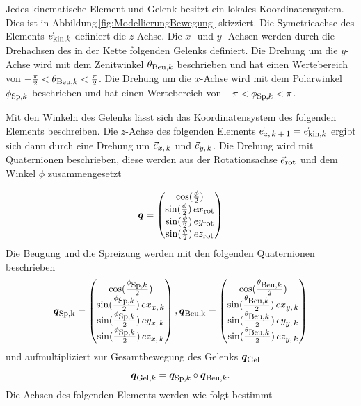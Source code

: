 Jedes kinematische Element und Gelenk besitzt ein lokales Koordinatensystem. Dies ist in Abbildung\,\ref{fig:ModellierungBewegung} skizziert. Die Symetrieachse des Elements $\vec{e}_{\textrm{\footnotesize{kin,$k$}}}$ definiert die $z$-Achse. Die $x$- und $y$- Achsen werden durch die Drehachsen des in der Kette folgenden Gelenks definiert. Die Drehung um die $y$-Achse wird mit dem Zenitwinkel $\theta_{\textrm{\footnotesize{Beu,$k$}}}$ beschrieben und hat einen Wertebereich von $-\frac{\pi}{2} < \theta_{\textrm{\footnotesize{Beu,$k$}}} < \frac{\pi}{2}$. Die Drehung um die $x$-Achse wird mit dem Polarwinkel $\phi_{\textrm{\footnotesize{Sp,$k$}}}$ beschrieben und hat einen Wertebereich von $-\pi < \phi_{\textrm{\footnotesize{Sp,$k$}}} < \pi$. 

Mit den Winkeln des Gelenks lässt sich das Koordinatensystem des folgenden Elements beschreiben. Die $z$-Achse des folgenden Elements $\vec{e}_{\textrm{\footnotesize{$z,k+1$}}} = \vec{e}_{\textrm{\footnotesize{kin,$k$}}}$ ergibt sich dann durch eine Drehung um $\vec{e}_{\textrm{\footnotesize{$x,k$}}}$ und $\vec{e}_{\textrm{\footnotesize{$y,k$}}}$. Die Drehung wird mit Quaternionen beschrieben, diese werden aus der Rotationsachse $\vec{e}_{\textrm{\footnotesize{rot}}}$ und dem Winkel $\phi$ zusammengesetzt 

\begin{equation}
    \mbox{\boldmath ${q}$} = \begin{pmatrix}
        \cos(\frac{\phi}{2}) \\
        \sin(\frac{\phi}{2})\,ex_{\textrm{\footnotesize{rot}}} \\
        \sin(\frac{\phi}{2})\,ey_{\textrm{\footnotesize{rot}}} \\
        \sin(\frac{\phi}{2})\,ez_{\textrm{\footnotesize{rot}}} 
    \end{pmatrix}
\end{equation}
Die Beugung und die Spreizung werden mit den folgenden Quaternionen beschrieben
\begin{equation}
    \mbox{\boldmath ${q}$}_{\textrm{\footnotesize{Sp,k}}} = \begin{pmatrix}
        \cos(\frac{\phi_{\textrm{\footnotesize{Sp,$k$}}}}{2}) \\
        \sin(\frac{\phi_{\textrm{\footnotesize{Sp,$k$}}}}{2})\,ex_{\textrm{\footnotesize{$x,k$}}} \\
        \sin(\frac{\phi_{\textrm{\footnotesize{Sp,$k$}}}}{2})\,ey_{\textrm{\footnotesize{$x,k$}}} \\
        \sin(\frac{\phi_{\textrm{\footnotesize{Sp,$k$}}}}{2})\,ez_{\textrm{\footnotesize{$x,k$}}} 
    \end{pmatrix},
    \mbox{\boldmath ${q}$}_{\textrm{\footnotesize{Beu,k}}} = \begin{pmatrix}
        \cos(\frac{\theta_{\textrm{\footnotesize{Beu,$k$}}}}{2}) \\
        \sin(\frac{\theta_{\textrm{\footnotesize{Beu,$k$}}}}{2})\,ex_{\textrm{\footnotesize{$y,k$}}} \\
        \sin(\frac{\theta_{\textrm{\footnotesize{Beu,$k$}}}}{2})\,ey_{\textrm{\footnotesize{$y,k$}}} \\
        \sin(\frac{\theta_{\textrm{\footnotesize{Beu,$k$}}}}{2})\,ez_{\textrm{\footnotesize{$y,k$}}} 
    \end{pmatrix}
\end{equation}
und aufmultipliziert zur Gesamtbewegung des Gelenks $\mbox{\boldmath ${q}$}_{\textrm{\footnotesize{Gel}}}$
\begin{equation}
    \mbox{\boldmath ${q}$}_{\textrm{\footnotesize{Gel,$k$}}} = \mbox{\boldmath ${q}$}_{\textrm{\footnotesize{Sp,$k$}}} \circ \mbox{\boldmath ${q}$}_{\textrm{\footnotesize{Beu,$k$}}}. 
\end{equation} 
Die Achsen des folgenden Elements werden wie folgt bestimmt

